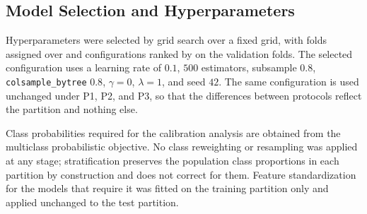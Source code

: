 \subsection{Model Selection and Hyperparameters}
\label{subsec:hparams}

Hyperparameters were selected by grid search over
a fixed grid, with folds assigned over
and configurations ranked by
on the validation folds. The selected configuration uses a learning rate
of $0.1$, $500$ estimators, subsample $0.8$, \texttt{colsample\_bytree}
$0.8$, $\gamma = 0$, $\lambda = 1$, and seed $42$.
The same configuration is used unchanged under P1, P2, and P3, so that
the differences between protocols reflect the partition and nothing else.

Class probabilities required for the calibration analysis are obtained
from
the multiclass probabilistic objective. No class reweighting or
resampling was applied at any stage; stratification preserves the
population class proportions in each partition by construction and does
not correct for them.
Feature standardization for the models that require it was fitted on the
training partition only and applied unchanged to the test partition.

